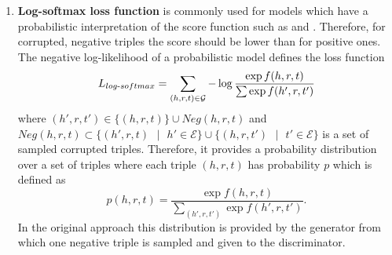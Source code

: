 \begin{enumerate}
    \item 
    \textbf{Log-softmax loss function} is commonly used for models which have a probabilistic interpretation of the score function such as \distmult and \complex.
    Therefore, for corrupted, negative triples the score should be lower than for positive ones.
    The negative log-likelihood of a probabilistic model defines the loss function \cite{cai2017kbgan}
    \begin{equation} \label{eq:nllloss}
        L_{log\text{-}softmax}=\sum_{(h,r,t)\in\mathcal{G}}-\log \frac{\exp f(h,r,t)}{\sum\exp f(h',r,t')}
    \end{equation}
    where $(h',r,t') \in \{(h,r,t)\} \cup Neg(h,r,t)$ and $Neg(h,r,t) \subset \{(h',r,t) \text{ }|\text{ }h' \in \mathcal{E}\} \cup \{(h,r,t')\text{ } |\text{ }t' \in \mathcal{E}\}$ is a set of sampled corrupted triples.
    Therefore, it provides a probability distribution over a set of triples where each triple $(h, r, t)$ has probability $p$ which is defined as \cite{cai2017kbgan}
    \begin{equation}
        p(h,r,t) = \frac{\exp f(h,r,t)}{\sum_{(h',r,t')}\exp f(h',r,t')}.
    \end{equation}
    In the original \kbgan approach this distribution is provided by the generator from which one negative triple is sampled and given to the discriminator.
\end{enumerate}


